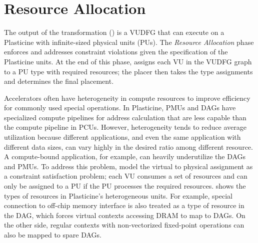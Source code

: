 \section{Resource Allocation} \label{sec:decompose}

The output of the transformation () is a VUDFG that 
can execute on a Plasticine with infinite-sized physical units (PUs).
The \emph{Resource Allocation} phase enforces and addresses constraint violations given 
the specification of the Plasticine units. 
At the end of this phase, \name assigns each VU in the VUDFG graph to a PU type with required
resources; the placer then takes the type assignments and determines the final placement.

Accelerators often have heterogeneity in compute resources to improve efficiency for commonly used
special operations.
In Plasticine, PMUs and DAGs have specialized compute pipelines for address calculation that are 
less capable than the compute pipeline in PCUs.
However, heterogeneity tends to reduce average utilization because different applications, and even the same
application with different data sizes, can vary highly in the desired ratio among different resource.
A compute-bound application, for example, can heavily underutilize the DAGs and PMUs.
To address this problem, \name model the virtual to physical assignment as a constraint satisfaction problem; 
each VU consumes a set of resources and can only be assigned to a PU if the PU processes the required resources. 
 shows the types of resources in Plasticine's heterogeneous units.
For example, special connection to off-chip memory interface is
also treated as a type of resource in the DAG, which forces virtual contexts accessing DRAM to map to DAGs. 
On the other side, regular contexts with non-vectorized fixed-point operations can also be mapped to spare DAGs.

